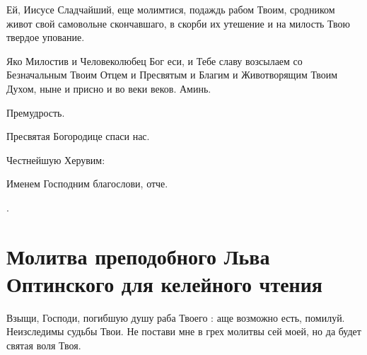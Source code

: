 \begin{mymulticols}
Ей, Иисусе Сладчайший, еще молимтися, подаждь рабом Твоим, сродником живот свой самовольне скончавшаго, в скорби их утешение и на милость Твою твердое упование.

Яко Милостив и Человеколюбец Бог еси, и Тебе славу возсылаем со Безначальным Твоим Отцем и Пресвятым и Благим и Животворящим Твоим Духом, ныне и присно и во веки веков. Аминь.

Премудрость.

Пресвятая Богородице спаси нас.

Честнейшую Херувим:

Именем Господним благослови, отче.

.

\end{mymulticols}

\section{Молитва преподобного Льва Оптинского для келейного чтения}\begin{mymulticols}

Взыщи, Господи, погибшую душу раба Твоего : аще возможно есть, помилуй. Неизследимы судьбы Твои. Не постави мне в грех молитвы сей моей, но да будет святая воля Твоя.

\end{mymulticols}

\mychapterending

